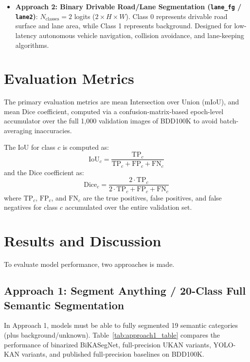 \documentclass[a4paper]{report}
\begin{document}
\begin{itemize}
\begin{itemize}
        \item \textbf{Approach 2: Binary Drivable Road/Lane Segmentation (\texttt{lane\_fg} / \texttt{lane2})}:
        $N_{\text{classes}} = 2$ logits ($2 \times H \times W$). Class 0 represents drivable road surface and lane area, while Class 1 represents background. Designed for low-latency autonomous vehicle navigation, collision avoidance, and lane-keeping algorithms.
    \end{itemize}
\end{itemize}

\section{Evaluation Metrics}
\label{sec:seg_benchmarks}

The primary evaluation metrics are mean Intersection over Union (mIoU), and mean Dice coefficient, computed via a confusion-matrix-based epoch-level accumulator over the full 1,000 validation images of BDD100K to avoid batch-averaging inaccuracies.

The IoU for class $c$ is computed as:
\begin{equation}
    \text{IoU}_c = \frac{\text{TP}_c}{\text{TP}_c + \text{FP}_c + \text{FN}_c}
\end{equation}
and the Dice coefficient as:
\begin{equation}
    \text{Dice}_c = \frac{2 \cdot \text{TP}_c}{2 \cdot \text{TP}_c + \text{FP}_c + \text{FN}_c}
\end{equation}
where $\text{TP}_c$, $\text{FP}_c$, and $\text{FN}_c$ are the true positives, false positives, and false negatives for class $c$ accumulated over the entire validation set.
\newpage
\section{Results and Discussion}
\label{sec:results_and_discussion}

To evaluate model performance, two approaches is made.

\subsection{Approach 1: Segment Anything / 20-Class Full Semantic Segmentation}
\label{sec:approach1_results}

In Approach 1, models must be able to fully segmented 19 semantic categories (plus background/unknown). Table~\ref{tab:approach1_table} compares the performance of binarized BiKASegNet, full-precision UKAN variants, YOLO-KAN variants, and published full-precision baselines on BDD100K.
\end{document}
